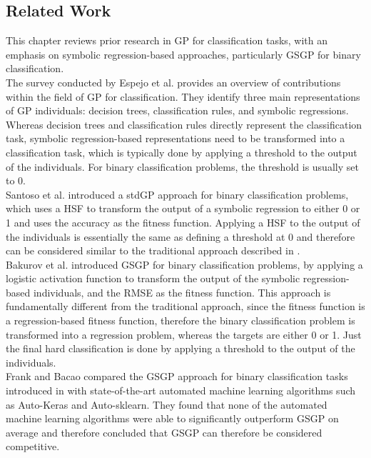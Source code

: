 \documentclass[manuscript, review, anonymous]{acmart} %
\begin{document}
\subsection{Related Work}
\label{sec:related_work}
This chapter reviews prior research in GP for classification tasks, 
with an emphasis on symbolic regression-based approaches, 
particularly GSGP for binary classification.\\
The survey conducted by Espejo et al. \cite{Espejo2010} provides an overview of 
contributions within the field of GP for classification.
They identify three main representations of GP individuals: 
decision trees, classification rules, and symbolic regressions.
Whereas decision trees and classification rules directly represent the classification task,
symbolic regression-based representations need to be transformed into a classification task, which is 
typically done by applying a threshold to the output of the individuals. For binary classification problems,
the threshold is usually set to 0.\\
Santoso et al. \cite{Santoso2021} introduced a stdGP approach for binary classification problems,
which uses a HSF to transform the output of a symbolic regression to either 0 or 1 and uses the accuracy as the fitness function.
Applying a HSF to the output of the individuals 
is essentially the same as defining a threshold at 0 and therefore can be considered similar to
the traditional approach described in \cite{Espejo2010}.\\
Bakurov et al. \cite{Bakurov2019} introduced GSGP for binary classification problems,
by applying a logistic activation function to transform the output of the symbolic regression-based individuals,
and the RMSE as the fitness function. This approach is fundamentally different from the traditional approach,
since the fitness function is a regression-based fitness function, therefore the binary classification problem is 
transformed into a regression problem, whereas the targets are either 0 or 1. Just the final hard classification
is done by applying a threshold to the output of the individuals.\\
Frank and Bacao \cite{Frank2023} compared the GSGP approach for binary classification tasks introduced in \cite{Bakurov2019} 
with state-of-the-art automated machine learning algorithms such as Auto-Keras and Auto-sklearn. They found that none of
the automated machine learning algorithms were able to significantly outperform GSGP on average and therefore concluded that GSGP
can therefore be considered competitive.\\
\end{document}

